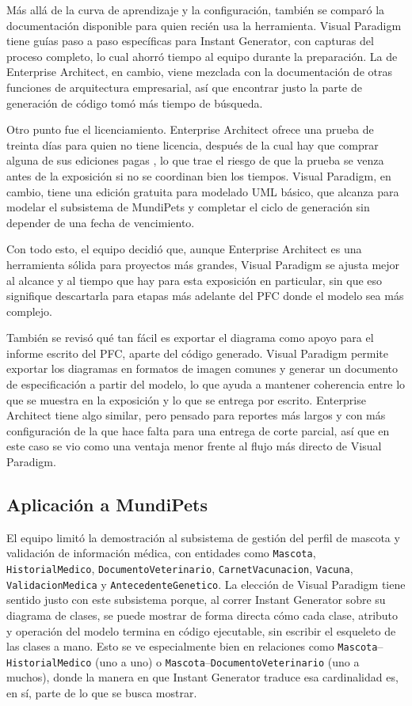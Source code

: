 \documentclass[journal,onecolumn]{IEEEtran}
\begin{document}
	Más allá de la curva de aprendizaje y la configuración, también se comparó la documentación disponible para quien recién usa la herramienta. Visual Paradigm tiene guías paso a paso específicas para Instant Generator, con capturas del proceso completo, lo cual ahorró tiempo al equipo durante la preparación. La de Enterprise Architect, en cambio, viene mezclada con la documentación de otras funciones de arquitectura empresarial, así que encontrar justo la parte de generación de código tomó más tiempo de búsqueda.
	
	Otro punto fue el licenciamiento. Enterprise Architect ofrece una prueba de treinta días para quien no tiene licencia, después de la cual hay que comprar alguna de sus ediciones pagas \cite{sparx_eatrial}, lo que trae el riesgo de que la prueba se venza antes de la exposición si no se coordinan bien los tiempos. Visual Paradigm, en cambio, tiene una edición gratuita para modelado UML básico, que alcanza para modelar el subsistema de MundiPets y completar el ciclo de generación sin depender de una fecha de vencimiento.
	
	Con todo esto, el equipo decidió que, aunque Enterprise Architect es una herramienta sólida para proyectos más grandes, Visual Paradigm se ajusta mejor al alcance y al tiempo que hay para esta exposición en particular, sin que eso signifique descartarla para etapas más adelante del PFC donde el modelo sea más complejo.
	
	También se revisó qué tan fácil es exportar el diagrama como apoyo para el informe escrito del PFC, aparte del código generado. Visual Paradigm permite exportar los diagramas en formatos de imagen comunes y generar un documento de especificación a partir del modelo, lo que ayuda a mantener coherencia entre lo que se muestra en la exposición y lo que se entrega por escrito. Enterprise Architect tiene algo similar, pero pensado para reportes más largos y con más configuración de la que hace falta para una entrega de corte parcial, así que en este caso se vio como una ventaja menor frente al flujo más directo de Visual Paradigm.
	
	\subsection{Aplicación a MundiPets}
	
	El equipo limitó la demostración al subsistema de gestión del perfil de mascota y validación de información médica, con entidades como \texttt{Mascota}, \texttt{HistorialMedico}, \texttt{DocumentoVeterinario}, \texttt{CarnetVacunacion}, \texttt{Vacuna}, \texttt{ValidacionMedica} y \texttt{AntecedenteGenetico}. La elección de Visual Paradigm tiene sentido justo con este subsistema porque, al correr Instant Generator sobre su diagrama de clases, se puede mostrar de forma directa cómo cada clase, atributo y operación del modelo termina en código ejecutable, sin escribir el esqueleto de las clases a mano. Esto se ve especialmente bien en relaciones como \texttt{Mascota}--\texttt{HistorialMedico} (uno a uno) o \texttt{Mascota}--\texttt{DocumentoVeterinario} (uno a muchos), donde la manera en que Instant Generator traduce esa cardinalidad es, en sí, parte de lo que se busca mostrar.
	
\end{document}
